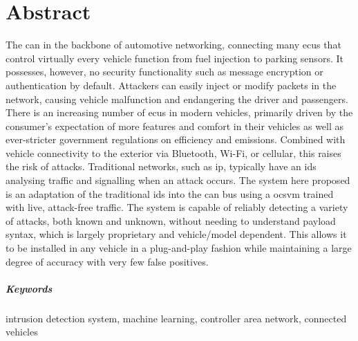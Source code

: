 \chapter{Abstract}


The \gls{can} in the backbone of automotive networking, connecting many \glspl{ecu} that control virtually every vehicle function from fuel injection to parking sensors. It possesses, however, no security functionality such as message encryption or authentication by default. Attackers can easily inject or modify packets in the network, causing vehicle malfunction and endangering the driver and passengers. There is an increasing number of \glspl{ecu} in modern vehicles, primarily driven by the consumer's expectation of more features and comfort in their vehicles as well as ever-stricter government regulations on efficiency and emissions. Combined with vehicle connectivity to the exterior via Bluetooth, Wi-Fi, or cellular, this raises the risk of attacks. Traditional networks, such as \gls{ip}, typically have an \gls{ids} analysing traffic and signalling when an attack occurs. The system here proposed is an adaptation of the traditional \gls{ids} into the \gls{can} bus using a \gls{ocsvm} trained with live, attack-free traffic. The system is capable of reliably detecting a variety of attacks, both known and unknown, without needing to understand payload syntax, which is largely proprietary and vehicle/model dependent. This allows it to be installed in any vehicle in a plug-and-play fashion while maintaining a large degree of accuracy with very few false positives.

\paragraph{Keywords} intrusion detection system, machine learning, controller area network, connected vehicles